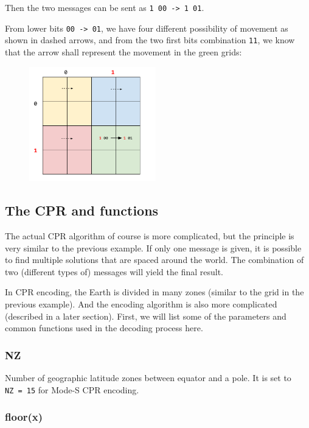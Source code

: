 Then the two messages can be sent as
\texttt{1\ 00\ -\textgreater{}\ 1\ 01}.

From lower bits \texttt{00\ -\textgreater{}\ 01}, we have four different
possibility of movement as shown in dashed arrows, and from the two
first bits combination \texttt{11}, we know that the arrow shall
represent the movement in the green grids:

\begin{figure}
  \center
  \includegraphics[width=5.5cm]{images/illustration-cpr-2.pdf}
\end{figure}

\subsection{The CPR and functions}\label{the-cpr-and-functions}

The actual CPR algorithm of course is more complicated, but the
principle is very similar to the previous example. If only one message
is given, it is possible to find multiple solutions that are spaced
around the world. The combination of two (different types of) messages
will yield the final result.

In CPR encoding, the Earth is divided in many zones (similar to the grid
in the previous example). And the encoding algorithm is also more
complicated (described in a later section). First, we will list some of
the parameters and common functions used in the decoding process here.

\subsubsection{NZ}\label{nz}

Number of geographic latitude zones between equator and a pole. It is
set to \texttt{NZ\ =\ 15} for Mode-S CPR encoding.

\subsubsection{floor(x)}\label{floorx}

